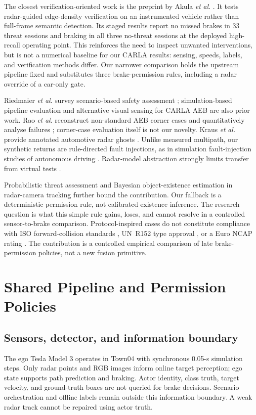 \documentclass[conference]{IEEEtran}
\begin{document}
The closest verification-oriented work is the preprint by Akula \emph{et al.}
\cite{akula2026radarguided}. It tests radar-guided edge-density verification on
an instrumented vehicle rather than full-frame semantic detection. Its staged
results report no missed brakes in 33 threat sessions and braking in all three
no-threat sessions at the deployed high-recall operating point. This reinforces
the need to inspect unwanted interventions, but is not a numerical baseline for
our CARLA results: sensing, speeds, labels, and verification methods differ.
Our narrower comparison holds the upstream pipeline fixed and substitutes
three brake-permission rules, including a radar override of a car-only gate.

Riedmaier \emph{et al.} survey scenario-based safety assessment \cite{riedmaier2020survey};
simulation-based pipeline evaluation \cite{gomez2022carla} and alternative
visual sensing for CARLA AEB \cite{feng2025dvs} are also prior work. Rao
\emph{et al.} reconstruct non-standard AEB corner cases and quantitatively
analyse failures \cite{rao2024corner}; corner-case evaluation itself is not our
novelty. Kraus \emph{et al.} provide annotated automotive radar ghosts
\cite{kraus2021ghost}. Unlike measured multipath, our synthetic returns are
rule-directed fault injections, as in simulation fault-injection studies of
autonomous driving \cite{jha2019mlfi}. Radar-model abstraction strongly limits
transfer from virtual tests \cite{magosi2022radar}.

Probabilistic threat assessment \cite{sandblom2011threat} and Bayesian
object-existence estimation in radar-camera tracking
\cite{lindenmaier2022existence} further bound the contribution. Our fallback is
a deterministic permission rule, not calibrated existence inference. The
research question is what this simple rule gains, loses, and cannot resolve in
a controlled sensor-to-brake comparison. Protocol-inspired cases do not
constitute compliance with ISO forward-collision standards
\cite{iso15623,iso22839}, UN~R152 type approval \cite{unr152}, or a Euro NCAP
rating \cite{euroncap_aeb}. The contribution is a controlled empirical
comparison of late brake-permission policies, not a new fusion primitive.

\section{Shared Pipeline and Permission Policies}
\subsection{Sensors, detector, and information boundary}
The ego Tesla Model 3 operates in Town04 with synchronous 0.05-s simulation
steps. Only radar points and RGB images inform online target perception;
ego state supports path prediction and braking. Actor identity, class truth,
target velocity, and ground-truth boxes are not queried for brake decisions.
Scenario orchestration and offline labels remain outside this information
boundary. A weak radar track cannot be repaired using actor truth.
\end{document}
